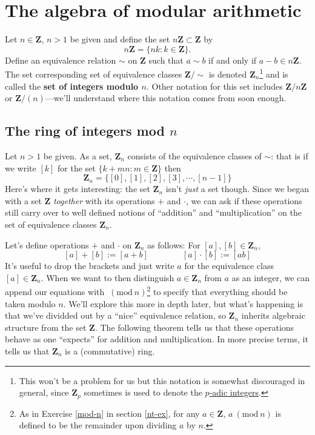 \documentclass[12pt]{article}
\numberwithin{equation}{subsection}
\theoremstyle{note}
\newcommand{\Mod}[1]{\ (\mathrm{mod}\ #1)}
\begin{document}
\begin{enumerate}[label=\arabic*.]
\end{enumerate}


\section{The algebra of modular arithmetic}

Let $n\in\mathbf{Z}$, $n>1$ be given and define the set $n\mathbf{Z}\subset \mathbf{Z}$ by \begin{equation} \label{nZ} n\mathbf{Z}=\{nk : k\in\mathbf{Z}\}. \end{equation} Define an equivalence relation $\sim$ on $\mathbf{Z}$ such that $a\sim b$ if and only if $a-b\in n\mathbf{Z}$. The set corresponding set of equivalence classes $\mathbf{Z}/\sim$ is denoted $\mathbf{Z}_n$\footnote{This won't be a problem for us but this notation is somewhat discouraged in general, since $\mathbf{Z}_p$ sometimes is used to denote the \href{https://en.wikipedia.org/wiki/P-adic_number}{$p$-adic integers}.} and is called the \textbf{set of integers modulo $n$}. Other notation for this set includes $\mathbf{Z}/n\mathbf{Z}$ or $\mathbf{Z}/(n)$---we'll understand where this notation comes from soon enough. 


\subsection{The ring of integers mod $n$}
	Let $n>1$ be given.  As a set, $\mathbf{Z}_n$ consists of the equivalence classes of $\sim$: that is if we write $[k]$ for the set $\{k+mn : m\in\mathbf{Z}\}$ then \[ \mathbf{Z}_n=\{[0],[1],[2],[3],\cdots,[n-1]\}\] Here's where it gets interesting: the set $\mathbf{Z}_n$ isn't \textit{just} a set though. Since we began with a set $\mathbf{Z}$ \textit{together} with its operations $+$ and $\cdot$, we can ask if these operations still carry over to well defined notions of ``addition'' and ``multiplication'' on the set of equivalence classes $\mathbf{Z}_n$. 
	
	Let's define operations $+$ and $\cdot$ on $\mathbf{Z}_n$ as follows: For $[a],[b]\in\mathbf{Z}_n$, \begin{equation} \label{add-mult-modn} [a]+[b]:=[a+b] \qquad \qquad  [a]\cdot [b]:=[ab]\end{equation} 
It's useful to drop the brackets and just write $a$ for the equivalence class $[a]\in\mathbf{Z}_n$. When we want to then distinguish $a\in\mathbf{Z}_n$ from $a$ as an integer, we can append our equations with $\Mod{n}$\footnote{As in Exercise \ref{mod-n} in section \ref{nt-ex}, for any $a\in\mathbf{Z}$, $a\Mod{n}$ is defined to be the remainder upon dividing $a$ by $n$.} to specify that everything should be taken modulo $n$. We'll explore this more in depth later, but what's happening is that we've dividded out by a ``nice'' equivalence relation, so $\mathbf{Z}_n$ inherits algebraic structure from the set $\mathbf{Z}$. The following theorem tells us that these operations behave as one ``expects'' for addition and multiplication. In more precise terms, it tells us that $\mathbf{Z}_n$ is a (commutative) ring. 
\end{document}
